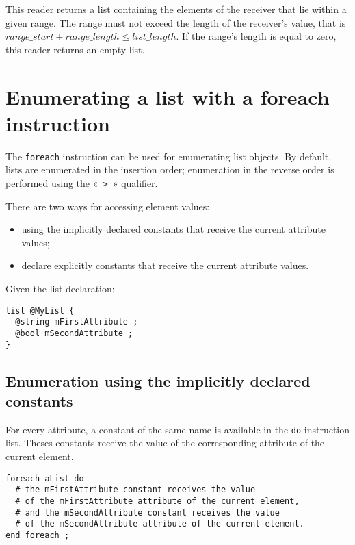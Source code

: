 This reader returns a list containing the elements of the receiver that lie within a given range. The range must not exceed the length of the receiver's value, that is $range\_start + range\_length \leqslant list\_length$. If the range's length is equal to zero, this reader returns an empty list.





\section{Enumerating a list with a foreach instruction}

The \lstinline[language=galgas]!foreach! instruction can be used for enumerating list objects. By default, lists are enumerated in the insertion order; enumeration in the reverse order is performed using the «~\lstinline[language=galgas]!>!~» qualifier.

There are two ways for accessing element values:
\begin{itemize}
\item using the implicitly declared constants that receive the current attribute values;
\item declare explicitly constants that receive the current attribute values.
\end{itemize}

Given the list declaration:

\begin{lstlisting}[language=galgas]
list @MyList {
  @string mFirstAttribute ;
  @bool mSecondAttribute ;
}
\end{lstlisting}

\subsection{Enumeration using the implicitly declared constants}

For every attribute, a constant of the same name is available in the \lstinline[language=galgas]!do! instruction list. Theses constants receive the value of the corresponding attribute of the current element.

\begin{lstlisting}[language=galgas]
foreach aList do
  # the mFirstAttribute constant receives the value
  # of the mFirstAttribute attribute of the current element,
  # and the mSecondAttribute constant receives the value
  # of the mSecondAttribute attribute of the current element.
end foreach ;
\end{lstlisting}

